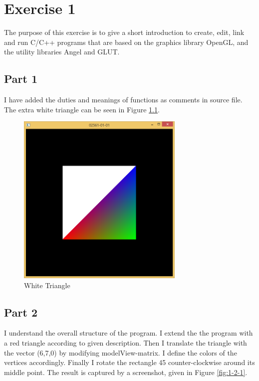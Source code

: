 \chapter{Exercise 1}
\label{sec:ugeopgave-1}

The purpose of this exercise is to give a short introduction to create, edit, link and run C/C++ programs that are based on the graphics library OpenGL, and the utility libraries Angel and GLUT.

\section{Part 1}
\label{sec:del-1}

I have added the duties and meanings of functions as comments in source file.\\
The extra white triangle can be seen in Figure \ref{fig:1-1-1}.

\begin{figure}[hp]
\centering
\includegraphics[width=8cm]{../Screenshots/ex-1/1.png}
\caption{White Triangle}
\label{fig:1-1-1}
\end{figure}


\section{Part 2}
\label{sec:del-2}

I understand the overall structure of the program. I extend the the program with a red triangle according to given description. Then I translate the triangle with the vector (6,7,0) by modifying modelView-matrix. I define the colors of the vertices accordingly. Finally I rotate the rectangle 45 counter-clockwise around its middle point. The result is captured by a screenshot, given in Figure \ref{fig:1-2-1}.

